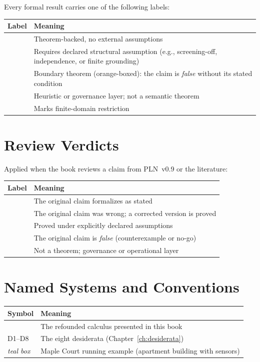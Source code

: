 \documentclass[11pt,openany]{report}
\begin{document}
Every formal result carries one of the following labels:

\begin{longtable}{@{}lp{}@{}}
\toprule
Label & Meaning \\
\midrule
\claimCore{} & Theorem-backed, no external assumptions \\
\claimConditional{} & Requires declared structural assumption (e.g., screening-off, independence, or finite grounding) \\
\claimBoundary{} & Boundary theorem (orange-boxed): the claim is \emph{false} without its stated condition \\
\claimOperational{} & Heuristic or governance layer; not a semantic theorem \\
\finitedomain{} & Marks finite-domain restriction \\
\bottomrule
\end{longtable}

\section*{Review Verdicts}

Applied when the book reviews a claim from PLN~v0.9 or the literature:

\begin{longtable}{@{}lp{}@{}}
\toprule
Label & Meaning \\
\midrule
\verdictClean{} & The original claim formalizes as stated \\
\verdictCorrected{} & The original claim was wrong; a corrected version is proved \\
\verdictAssumption{} & Proved under explicitly declared assumptions \\
\verdictNoGo{} & The original claim is \emph{false} (counterexample or no-go) \\
\verdictHeuristic{} & Not a theorem; governance or operational layer \\
\bottomrule
\end{longtable}

\section*{Named Systems and Conventions}

\begin{longtable}{@{}lp{}@{}}
\toprule
Symbol & Meaning \\
\midrule
\xiPLN{} & The refounded calculus presented in this book \\
D1--D8 & The eight desiderata (Chapter~\ref{ch:desiderata}) \\
\emph{teal box} & Maple Court running example (apartment building with sensors) \\
\bottomrule
\end{longtable}
\end{document}
